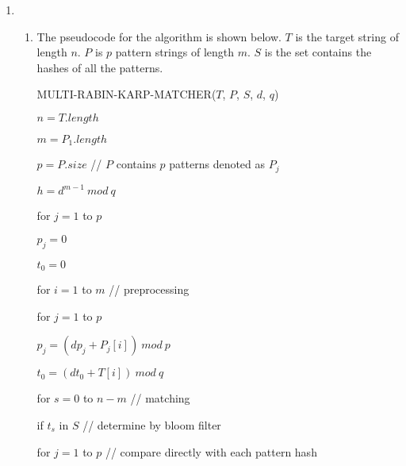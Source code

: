 \documentclass[11pt,letterpaper,oneside]{article}
\begin{document}
\begin{enumerate}
\begin{enumerate}
\end{enumerate}

\item 
\begin{enumerate}
\item The pseudocode for the algorithm is shown below. $T$ is the target string of length $n$. $P$ is $p$ pattern strings of length $m$. $S$ is the set contains the hashes of all the patterns.

\vspace{1em}\hspace{2em} MULTI-RABIN-KARP-MATCHER($T$, $P$, $S$, $d$, $q$)

\hspace{3em}    $n = T.length$

\hspace{3em}    $m = P_1.length$

\hspace{3em}    $p = P.size$   \hspace{4em}// $P$ contains $p$ patterns denoted as $P_j$

\hspace{3em}    $h = d^{m-1}\ mod\ q$

\hspace{3em}    for $j = 1$ to $p$
 
\hspace{4em}        $p_j = 0$

\hspace{3em}    $t_0 = 0$

\hspace{3em}    for $i = 1$ to $m$   \hspace{4em}// preprocessing
 
\hspace{4em}        for $j = 1$ to $p$
 
\hspace{5em}            $p_j = (dp_j + P_j[i])\ mod\ p$

\hspace{4em}        $t_0 = (dt_0 + T[i])\ mod\ q$

\hspace{3em}    for $s = 0$ to $n-m$    \hspace{4em}// matching
 
\hspace{4em}        if $t_s$ in $S$    \hspace{4em}// determine by bloom filter

\hspace{5em}            for $j = 1$ to $p$    \hspace{4em}// compare directly with each pattern hash
 

\end{enumerate}
\end{enumerate}
\end{document}
